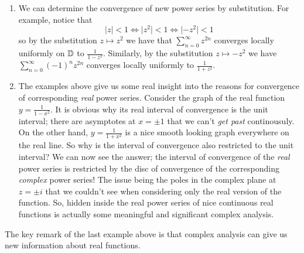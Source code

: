 \begin{example}
\begin{enumerate}
        \item We can determine the convergence of new power series by substitution.
            For example,
            notice that 
            \[ \lvert z \rvert < 1 \iff \lvert z^2 \rvert < 1 \iff \lvert -z^2 \rvert < 1 \]
            so by the substitution $z \mapsto z^2$ we have that
            $\sum_{n = 0}^\infty z^{2n}$
            converges locally uniformly on $\mathbb{D}$ to
            $\frac1{1 - z^2}$.
            Similarly, by the substitution $z \mapsto -z^2$ we have
            $\sum_{n = 0}^\infty (-1)^n z^{2n}$
            converges locally uniformly to $\frac1{1 + z^2}$.

        \item The examples above give us some real insight into the reasons for convergence of corresponding \emph{real} power series.
            Consider the graph of the real function $y = \frac1{1-x^2}$.
            It is obvious why its real interval of convergence is the unit interval;
            there are asymptotes at $x = \pm 1$ that we can't \emph{get past} continousuly.
            On the other hand,
            $y = \frac1{1+x^2}$ is a nice smooth looking graph everywhere on the real line.
            So why is the interval of convergence also restricted to the unit interval?
            We can now see the answer;
            the interval of convergence of the \emph{real} power series is restricted by the disc of convergence of the corresponding \emph{complex} power series!
            The issue being the poles in the complex plane at $z = \pm i$ that we couldn't see when considering only the real version of the function.
            So, hidden inside the real power series of nice continuous real functions is actually some meaningful and significant complex analysis.
    \end{enumerate}
\end{example}

\begin{remark}
    The key remark of the last example above is that complex analysis can give us new information about real functions.
\end{remark}

